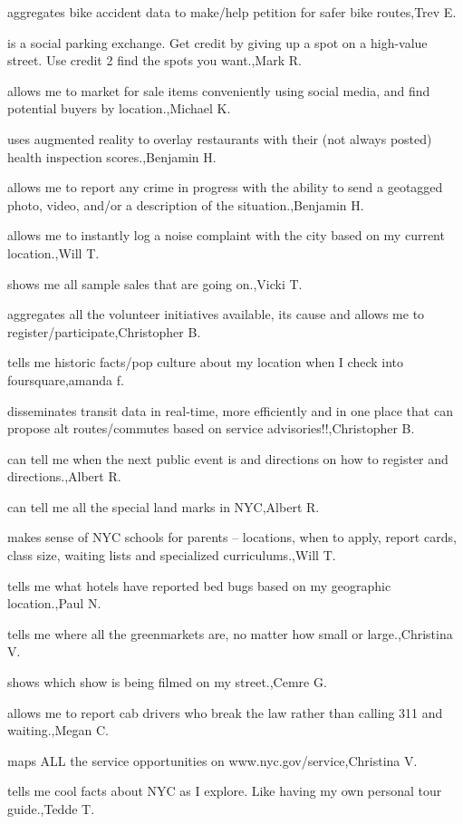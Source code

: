 \documentclass{article}
\begin{document}
aggregates bike accident data to make/help petition for safer bike routes,Trev E.

is a social parking exchange.  Get credit by giving up a spot on a high-value street.  Use credit 2 find the spots you want.,Mark R.

allows me to market for sale items conveniently using social media, and find potential buyers by location.,Michael K.

uses augmented reality to overlay restaurants with their (not always posted) health inspection scores.,Benjamin H.

allows me to report any crime in progress with the ability to send a geotagged photo, video, and/or a description of the situation.,Benjamin H.

allows me to instantly log a noise complaint with the city based on my current location.,Will T.

shows me all sample sales that are going on.,Vicki T.

aggregates all the volunteer initiatives available, its cause and allows me to register/participate,Christopher B.

tells me historic facts/pop culture about my location when I check into foursquare,amanda f.

disseminates transit data in real-time, more efficiently and in one place that can propose alt routes/commutes based on service advisories!!,Christopher B.

can tell me when the next public event is and directions on how to register and directions.,Albert R.

can tell me all the special land marks in NYC,Albert R.

makes sense of NYC schools for parents -- locations, when to apply, report cards, class size, waiting lists and specialized curriculums.,Will T.

tells me what hotels have reported bed bugs based on my geographic location.,Paul N.

tells me where all the greenmarkets are, no matter how small or large.,Christina  V.

shows which show is being filmed on my street.,Cemre G.

allows me to report cab drivers who break the law rather than calling 311 and waiting.,Megan C.

maps ALL the service opportunities on www.nyc.gov/service,Christina  V.

tells me cool facts about NYC as I explore. Like having my own personal tour guide.,Tedde T.
\end{document}
